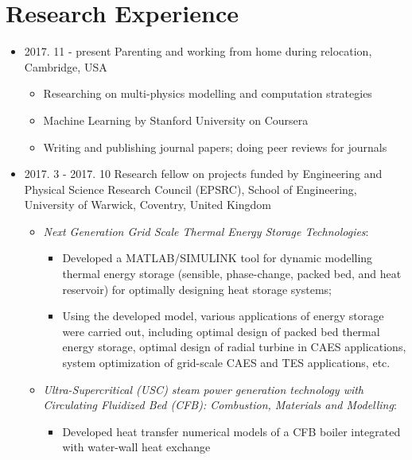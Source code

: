 \documentclass[letterpaper]{article}
\begin{document}
\vspace{-12pt}
\section*{Research Experience}
\vspace{-10pt}
\begin{itemize}
\item 2017. 11 - present \hspace{2pt} Parenting and working from home during relocation, Cambridge, USA
		\begin{itemize}
		\item Researching on multi-physics modelling and computation strategies
		\item Machine Learning by Stanford University on Coursera
		\item Writing and publishing journal papers; doing peer reviews for journals
		\end{itemize}		
\item 2017. 3 - 2017. 10  \hspace{2pt} Research fellow on projects funded by Engineering and Physical Science Research Council (EPSRC), School of Engineering, University of Warwick, Coventry, United Kingdom
		\begin{itemize}
		\item \textsl{	Next Generation Grid Scale Thermal Energy Storage Technologies}: 
					\begin{itemize}
					\item Developed a MATLAB/SIMULINK tool for dynamic modelling thermal energy storage (sensible, phase-change, packed bed, and heat reservoir) for optimally designing heat storage systems;
					\item Using the developed model, various applications of energy storage were carried out, including optimal design of packed bed thermal energy storage, optimal design of radial turbine in CAES applications, system optimization of grid-scale CAES and TES applications, etc.
					\end{itemize}

		\item	\textsl{Ultra-Supercritical (USC) steam power generation technology with Circulating Fluidized Bed (CFB): Combustion, Materials and Modelling}: 
					\begin{itemize}
					\item Developed heat transfer numerical models of a CFB boiler integrated with water-wall heat exchange
					\end{itemize}
		\end{itemize}


\end{itemize}
\end{document}
